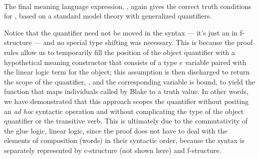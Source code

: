 \begin{exe}
  \ex
  \begin{minipage}[t]{0.9\textwidth}
    \medskip\\
\nopagebreak
{}
\end{minipage}
\end{exe}

\noindent
The final meaning language expression,
, again gives the correct truth
  conditions for , based on a standard
  model theory with generalized quantifiers. 
  
  Notice that the
  quantifier need not be moved in the syntax --- it's just an
   in f-structure --- and no special type shifting was
  necessary. This is because the proof rules  allow 
  us to temporarily fill the position of the object quantifier with a
  hypothetical meaning constructor that consists of a type $e$ variable
  paired with the linear logic term for the object; this assumption is
  then discharged to return the scope
  of the quantifier, , and the corresponding
  variable is bound, to yield the function that maps individuals called
  by Blake to a truth value. In other words, we have demonstrated that
  this approach scopes the quantifier without positing an \emph{ad
    hoc} syntactic operation and without complicating the type of the
  object quantifier or the transitive verb. This is ultimately due to
  the commutativity of the glue logic, linear logic, since the proof
  does not have to deal with the elements of composition (words) in
  their syntactic order, because the syntax is separately represented by
  c-structure (not shown here) and f-structure. 

